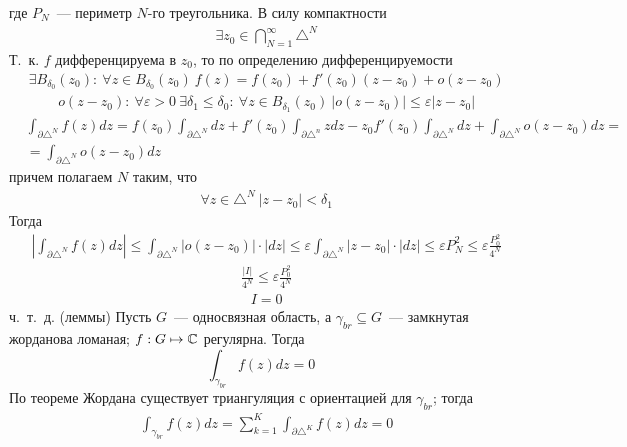 где $P_N$~--- периметр $N$-го треугольника.
В силу компактности
\begin{align*}
  & \exists z_0 \in \bigcap_{N=1}^{\infty}\triangle^N
\end{align*}
Т.~к. $f$ дифференцируема в $z_0$, то по определению дифференцируемости
\begin{align*}
  & \exists B_{\delta_0}(z_0): \ \forall z \in B_{\delta_0}(z_0) \ f(z) = f(z_0)+f'(z_0)(z-z_0) + o(z-z_0)
\end{align*}
\begin{align*}
  & o(z-z_0): \ \forall \varepsilon > 0 \ \exists \delta_1 \leq \delta_0: \ \forall z \in B_{\delta_1}(z_0) \ \left| o(z-z_0) \right| \leq \varepsilon\left| z-z_0 \right|
\end{align*}
\begin{align*}
  & \int_{\partial \triangle^N}f(z)dz = f(z_0)\int_{\partial \triangle^N}dz+f'(z_0)\int_{\partial \triangle^n}zdz - z_0 f'(z_0)\int_{\partial \triangle^N} dz + \int_{\partial \triangle^N}o(z-z_0)dz = \\
  & = \int_{\partial \triangle^N}o(z-z_0)dz
\end{align*}
причем полагаем $N$ таким, что
\begin{align*}
  & \forall z \in \triangle^N \ \left| z-z_0 \right| < \delta_1
\end{align*}
Тогда
\begin{align*}
  & \left| \int_{\partial \triangle^N}f(z)dz \right| \leq \int_{\partial \triangle^N} \left| o(z-z_0) \right|\cdot \left| dz \right| \leq \varepsilon\int_{\partial\triangle^N}\left| z-z_0 \right|\cdot\left| dz \right| \leq \varepsilon P^2_N \leq \varepsilon \frac{P^2_0}{4^N}
\end{align*}
\begin{align*}
  & \frac{\left| I \right|}{4^N} \leq \varepsilon \frac{P^2_0}{4^N}
\end{align*}
\begin{align*}
  & I = 0
\end{align*}
ч.~т.~д.
\corollary (леммы)
Пусть $G$~--- односвязная область, а $\gamma_{br} \subseteq
G$~--- замкнутая жорданова ломаная; $f:G \mapsto \mathbb{C}$ регулярна. Тогда
\begin{equation} \label{(7.3)}
  \int_{\gamma_{br}} f(z)dz = 0
\end{equation}
\pr
По теореме Жордана существует триангуляция с ориентацией для $\gamma_{br}$;
тогда 
\begin{align*}
  & \int_{\gamma_{br}} f(z)dz = \sum_{k=1}^K\int_{\partial\triangle^K}f(z)dz = 0
\end{align*}
